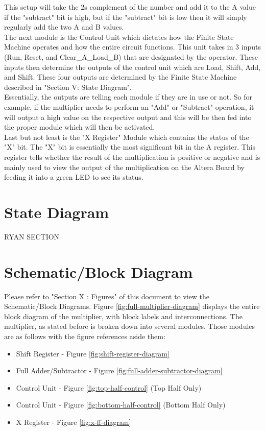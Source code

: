 \documentclass[journal, twocolumn, final,11pt,letterpaper]{IEEEtran}
\begin{document}
This setup will take the 2s complement of the number and add it to the A value if the "subtract" bit is high, but if the "subtract" bit is low then it will simply regularly add the two A and B values. \\

The next module is the Control Unit which dictates how the Finite State Machine operates and how the entire circuit functions. This unit takes in 3 inputs (Run, Reset, and Clear\_A\_Load\_B) that are designated by the operator. These inputs then determine the outputs of the control unit which are Load, Shift, Add, and Shift. These four outputs are determined by the Finite State Machine described in "Section V: State Diagram".\\

 Essentially, the outputs are telling each module if they are in use or not. So for example, if the multiplier needs to perform an "Add" or "Subtract" operation, it will output a high value on the respective output and this will be then fed into the proper module which will then be activated. \\

Last but not least is the "X Register" Module which contains the status of the "X" bit. The "X" bit is essentially the most significant bit in the A register. This register tells whether the result of the multiplication is positive or negative and is mainly used to view the output of the multiplication on the Altera Board by feeding it into a green LED to see its status. 

\section{State Diagram}
RYAN SECTION

\section{Schematic/Block Diagram}
Please refer to "Section X : Figures" of this document to view the Schematic/Block Diagrams. Figure \ref{fig:full-multiplier-diagram} displays the entire block diagram of the multiplier, with block labels and interconnections. The multiplier, as stated before is broken down into several modules. Those modules are as follows with the figure references aside them:
\begin{itemize}
	\item Shift Register - Figure \ref{fig:shift-register-diagram}
	\item Full Adder/Subtractor - Figure \ref{fig:full-adder-subtractor-diagram}
	\item Control Unit - Figure \ref{fig:top-half-control} (Top Half Only)
	\item Control Unit - Figure \ref{fig:bottom-half-control} (Bottom Half Only)
	\item X Register - Figure \ref{fig:x-ff-diagram}
\end{itemize}
\end{document}
